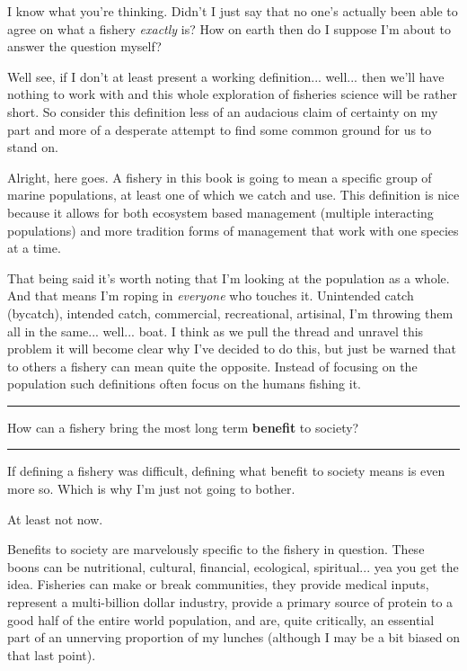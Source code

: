 \documentclass[11pt,a5paper]{book}
\begin{document}
I know what you're thinking. Didn't I just say that no one's actually been able to agree on what a fishery \textit{exactly} is? How on earth then do I suppose I'm about to answer the question myself? 
\newline

Well see, if I don't at least present a working definition... well... then we'll have nothing to work with and this whole exploration of fisheries science will be rather short. So consider this definition less of an audacious claim of certainty on my part and more of a desperate attempt to find some common ground for us to stand on. 
\newline

Alright, here goes. A fishery in this book is going to mean a specific group of marine populations, at least one of which we catch and use. This definition is nice because it allows for both ecosystem based management (multiple interacting populations) and more tradition forms of management that work with one species at a time. 
\newline

That being said it's worth noting that I'm looking at the population as a whole. And that means I'm roping in \textit{everyone} who touches it. Unintended catch (bycatch), intended catch, commercial, recreational, artisinal, I'm throwing them all in the same... well... boat. I think as we pull the thread and unravel this problem it will become clear why I've decided to do this, but just be warned that to others a fishery can mean quite the opposite. Instead of focusing on the population such definitions often focus on the humans fishing it. 
\newpage

\noindent \rule{\textwidth}{0.5pt} 
\noindent How can a fishery bring the most long term \textbf{benefit} to society?
\newline
\rule{\textwidth}{0.5pt} 
\vspace{5pt}

If defining a fishery was difficult, defining what benefit to society means is even more so. Which is why I'm just not going to bother.
\newline

At least not now.
\newline

Benefits to society are marvelously specific to the fishery in question. These boons can be nutritional, cultural, financial, ecological, spiritual... yea you get the idea. Fisheries can make or break communities, they provide medical inputs, represent a multi-billion dollar industry, provide a primary source of protein to a good half of the entire world population, and are, quite critically, an essential part of an unnerving proportion of my lunches (although I may be a bit biased on that last point).
\newline
\end{document}
